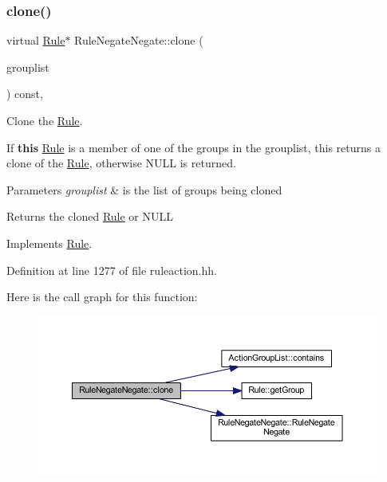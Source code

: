 \subsubsection{\texorpdfstring{clone()}{clone()}}
{\footnotesize\ttfamily virtual \mbox{\hyperlink{class_rule}{Rule}}$\ast$ Rule\+Negate\+Negate\+::clone (\begin{DoxyParamCaption}\item[{const \mbox{\hyperlink{class_action_group_list}{Action\+Group\+List}} \&}]{grouplist }\end{DoxyParamCaption}) const\hspace{0.3cm}{\ttfamily [inline]}, {\ttfamily [virtual]}}



Clone the \mbox{\hyperlink{class_rule}{Rule}}. 

If {\bfseries{this}} \mbox{\hyperlink{class_rule}{Rule}} is a member of one of the groups in the grouplist, this returns a clone of the \mbox{\hyperlink{class_rule}{Rule}}, otherwise N\+U\+LL is returned. 
\begin{DoxyParams}{Parameters}
{\em grouplist} & is the list of groups being cloned \\
\hline
\end{DoxyParams}
\begin{DoxyReturn}{Returns}
the cloned \mbox{\hyperlink{class_rule}{Rule}} or N\+U\+LL 
\end{DoxyReturn}


Implements \mbox{\hyperlink{class_rule_a70de90a76461bfa7ea0b575ce3c11e4d}{Rule}}.



Definition at line 1277 of file ruleaction.\+hh.

Here is the call graph for this function\+:
\nopagebreak
\begin{figure}[H]
\begin{center}
\leavevmode
\includegraphics[width=350pt]{class_rule_negate_negate_a50298fc906e6a8335e63ce3c4f65f6e7_cgraph}
\end{center}
\end{figure}
\mbox{\label{class_rule_negate_negate_a587e4098de2c9d06501d0b8a1800afbf}} 

